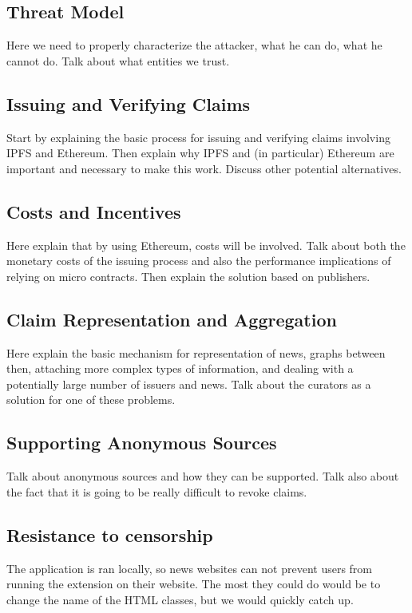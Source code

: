 \subsection{Threat Model}

Here we need to properly characterize the attacker, what he can do, what he cannot do. Talk about what entities we trust.


\subsection{Issuing and Verifying Claims}

Start by explaining the basic process for issuing and verifying claims involving IPFS and Ethereum. Then explain why IPFS and (in particular) Ethereum are important and necessary to make this work. Discuss other potential alternatives.


\subsection{Costs and Incentives}

Here explain that by using Ethereum, costs will be involved. Talk about both the monetary costs of the issuing process and also the performance implications of relying on micro contracts. Then explain the solution based on publishers.


\subsection{Claim Representation and Aggregation}

Here explain the basic mechanism for representation of news, graphs between then, attaching more complex types of information, and dealing with a potentially large number of issuers and news. Talk about the curators as a solution for one of these problems.


\subsection{Supporting Anonymous Sources}

Talk about anonymous sources and how they can be supported. Talk also about the fact that it is going to be really difficult to revoke claims.

\subsection{Resistance to censorship}
The application is ran locally, so news websites can not prevent users from running the extension on their website. The most they could do would be to change the name of the HTML classes, but we would quickly catch up.

